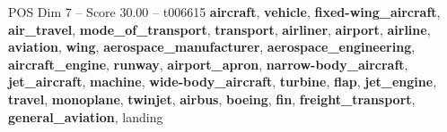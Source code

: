 \begin{textsample}{POS Dim 7 – Score 30.00 – t006615}  \label{ex:f7_pos_002}
\textbf{aircraft}, \textbf{vehicle}, \textbf{fixed-wing\_aircraft}, \textbf{air\_travel}, \textbf{mode\_of\_transport}, \textbf{transport}, \textbf{airliner}, \textbf{airport}, \textbf{airline}, \textbf{aviation}, \textbf{wing}, \textbf{aerospace\_manufacturer}, \textbf{aerospace\_engineering}, \textbf{aircraft\_engine}, \textbf{runway}, \textbf{airport\_apron}, \textbf{narrow-body\_aircraft}, \textbf{jet\_aircraft}, \textbf{machine}, \textbf{wide-body\_aircraft}, \textbf{turbine}, \textbf{flap}, \textbf{jet\_engine}, \textbf{travel}, \textbf{monoplane}, \textbf{twinjet}, \textbf{airbus}, \textbf{boeing}, \textbf{fin}, \textbf{freight\_transport}, \textbf{general\_aviation}, landing

\end{textsample}
